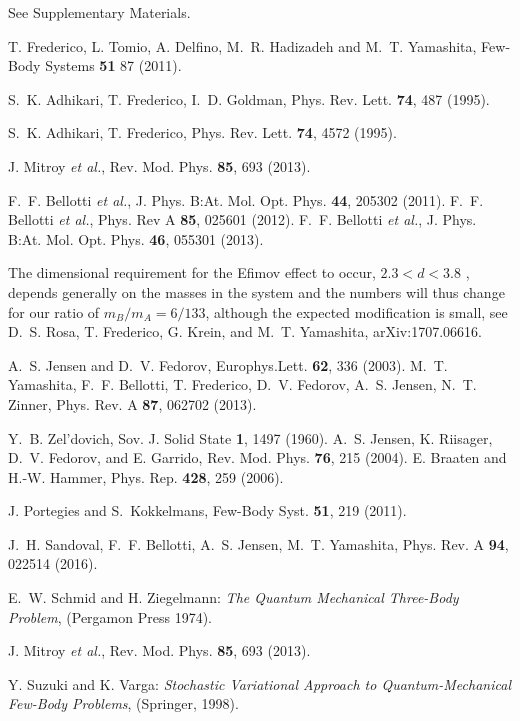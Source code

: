 \documentclass[twocolumn,showpacs,aps,prl,10pt]{revtex4}
\begin{document}
\begin{thebibliography}{99}
 See Supplementary Materials.


 T. Frederico, L. Tomio, A. Delfino, M.~R. Hadizadeh and M.~T. Yamashita, Few-Body Systems {\bf 51} 87 (2011).

 S.~K. Adhikari, T. Frederico, I.~D. Goldman, Phys. Rev.  Lett. {\bf 74}, 487 (1995).

 S.~K. Adhikari, T. Frederico, Phys. Rev. Lett. {\bf 74}, 4572 (1995).

 J. Mitroy {\it et al.}, Rev. Mod. Phys. {\bf 85}, 693 (2013).

 F.~F. Bellotti {\it et al.}, J. Phys. B:At. Mol. Opt. Phys. {\bf 44}, 205302 (2011).
 F.~F. Bellotti {\it et al.}, Phys. Rev A {\bf 85}, 025601 (2012).
 F.~F. Bellotti {\it et al.}, J. Phys. B:At. Mol. Opt. Phys. {\bf 46}, 055301 (2013).

 The dimensional requirement for the Efimov effect to occur, $2.3<d<3.8$ \cite{nie01}, 
depends generally on the masses in the system and the numbers will thus change for our ratio 
of $m_B/m_A=6/133$, although the expected modification is small, see
D.~S. Rosa, T. Frederico, G. Krein, and M.~T. Yamashita, arXiv:1707.06616.

 A.~S. Jensen and D.~V. Fedorov, Europhys.Lett. {\bf 62},
  336 (2003).
  M.~T. Yamashita, F.~F. Bellotti, T. Frederico, D.~V. Fedorov,
A.~S. Jensen, N.~T. Zinner, Phys. Rev. A {\bf 87}, 062702 (2013).

 Y.~B. Zel'dovich, Sov. J. Solid State {\bf 1}, 1497 (1960).
 A.~S. Jensen, K. Riisager, D.~V. Fedorov, and E. Garrido, Rev. Mod. Phys. {\bf 76}, 215 (2004).
 E. Braaten and H.-W. Hammer, Phys. Rep. {\bf 428}, 259 (2006).

 J. Portegies and S.~Kokkelmans, Few-Body Syst. {\bf 51}, 219 (2011).

 J.~H. Sandoval, F.~F. Bellotti, A.~S. Jensen, M.~T. Yamashita,
Phys. Rev. A {\bf 94}, 022514 (2016).




 E.~W. Schmid and H. Ziegelmann: \emph{The Quantum Mechanical Three-Body Problem}, 
(Pergamon Press 1974).

 J. Mitroy {\it et al.}, Rev. Mod. Phys. {\bf 85}, 693 (2013).

 Y. Suzuki and K. Varga: \emph{Stochastic Variational Approach to 
Quantum-Mechanical Few-Body Problems}, (Springer, 1998).


\end{thebibliography}
\end{document}

